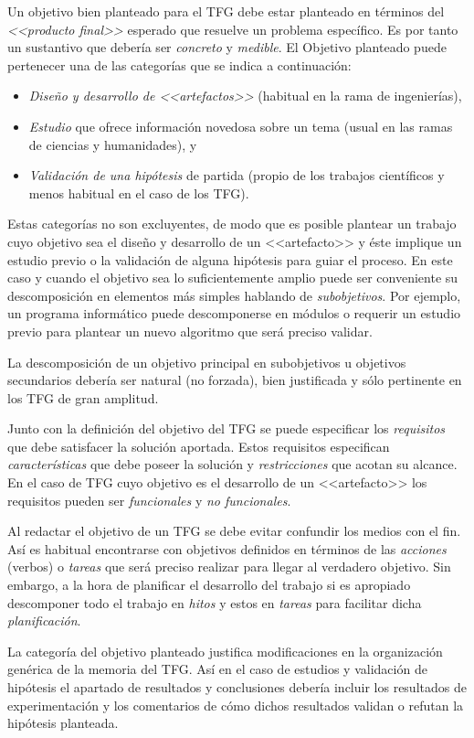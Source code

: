 Un objetivo bien planteado para el TFG debe estar planteado en términos del \emph{<<producto final>>} esperado que resuelve un problema específico. Es por tanto un sustantivo que debería ser \emph{concreto} y \emph{medible}. El Objetivo planteado puede pertenecer una de las categorías que se indica a continuación:
\begin{itemize}
	\item \emph{Diseño y desarrollo de <<artefactos>>} (habitual en la rama de ingenierías),
	\item \emph{Estudio} que ofrece información novedosa sobre un tema (usual en las ramas de ciencias y humanidades), y
	\item \emph{Validación de una hipótesis} de partida (propio de los trabajos científicos y menos habitual en el caso de los TFG).
\end{itemize}

Estas categorías no son excluyentes, de modo que es posible plantear un trabajo cuyo objetivo sea el diseño y desarrollo de un <<artefacto>> y éste implique un estudio previo o la validación de alguna hipótesis para guiar el proceso. En este caso y cuando el objetivo sea lo suficientemente amplio puede ser conveniente su descomposición en elementos más simples hablando de \emph{subobjetivos}. Por ejemplo, un programa informático puede descomponerse en módulos o requerir un estudio previo para plantear un nuevo algoritmo que será preciso validar. 

La descomposición de un objetivo principal en subobjetivos u objetivos secundarios debería ser natural (no forzada), bien justificada y sólo pertinente en los TFG de gran amplitud.

Junto con la definición del objetivo del TFG se puede especificar los \emph{requisitos} que debe satisfacer la solución aportada. Estos requisitos especifican \emph{características} que debe poseer la solución y \emph{restricciones} que acotan su alcance. En el caso de TFG cuyo objetivo es el desarrollo de un <<artefacto>> los requisitos pueden ser \emph{funcionales} y \emph{no funcionales}.

Al redactar el objetivo de un TFG se debe evitar confundir los medios con el fin. Así es habitual encontrarse con objetivos definidos en términos de las \emph{acciones} (verbos) o \emph{tareas} que será preciso realizar para llegar al verdadero objetivo. Sin embargo, a la hora de planificar el desarrollo del trabajo si es apropiado descomponer todo el trabajo en \emph{hitos} y estos en \emph{tareas} para facilitar dicha \emph{planificación}.


La categoría del objetivo planteado justifica modificaciones en la organización genérica de la memoria del TFG. Así en el caso de estudios y validación de hipótesis el apartado de resultados y conclusiones debería incluir los resultados de experimentación y los comentarios de cómo dichos resultados validan o refutan la hipótesis planteada.

